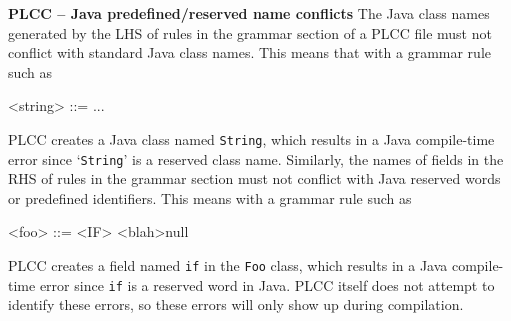 \begin{minipage}[t]{\sw}
\slidenumber
\LARGE
{\bf PLCC -- Java predefined/reserved name conflicts}\exx
The Java class names generated by the LHS of rules
in the grammar section of a PLCC file
must not conflict with standard Java class names.
This means that with a grammar rule such as
{\Large
\begin{qv}
<string> ::= ...
\end{qv}
}
PLCC creates a Java class named \verb'String',
which results in a Java compile-time error
since `\verb'String'' is a reserved class name.\exx
Similarly, the names of fields in the RHS of rules
in the grammar section must not conflict
with Java reserved words or predefined identifiers.
This means with a grammar rule such as
{\Large
\begin{qv}
<foo> ::= <IF> <blah>null
\end{qv}
}
PLCC creates a field named \verb'if' in the \verb'Foo' class,
which results in a Java compile-time error
since \verb'if' is a reserved word in Java.
PLCC itself does not attempt to identify these errors,
so these errors will only show up during compilation.
\end{minipage}
\clearpage
